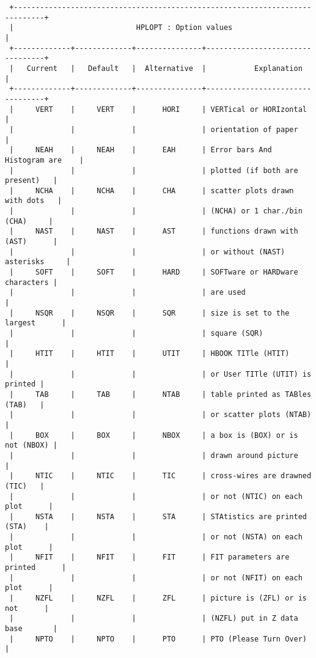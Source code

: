 \begin{verbatim}
 +-----------------------------------------------------------------------------+
 |                            HPLOPT : Option values                           |
 +-------------+-------------+---------------+---------------------------------+
 |   Current   |   Default   |  Alternative  |           Explanation           |
 +-------------+-------------+---------------+---------------------------------+
 |     VERT    |     VERT    |      HORI     | VERTical or HORIzontal          |
 |             |             |               | orientation of paper            |
 |     NEAH    |     NEAH    |      EAH      | Error bars And Histogram are    |
 |             |             |               | plotted (if both are present)   |
 |     NCHA    |     NCHA    |      CHA      | scatter plots drawn with dots   |
 |             |             |               | (NCHA) or 1 char./bin (CHA)     |
 |     NAST    |     NAST    |      AST      | functions drawn with (AST)      |
 |             |             |               | or without (NAST) asterisks     |
 |     SOFT    |     SOFT    |      HARD     | SOFTware or HARDware characters |
 |             |             |               | are used                        |
 |     NSQR    |     NSQR    |      SQR      | size is set to the largest      |
 |             |             |               | square (SQR)                    |
 |     HTIT    |     HTIT    |      UTIT     | HBOOK TITle (HTIT)              |
 |             |             |               | or User TITle (UTIT) is printed |
 |     TAB     |     TAB     |      NTAB     | table printed as TABles (TAB)   |
 |             |             |               | or scatter plots (NTAB)         |
 |     BOX     |     BOX     |      NBOX     | a box is (BOX) or is not (NBOX) |
 |             |             |               | drawn around picture            |
 |     NTIC    |     NTIC    |      TIC      | cross-wires are drawned (TIC)   |
 |             |             |               | or not (NTIC) on each plot      |
 |     NSTA    |     NSTA    |      STA      | STAtistics are printed (STA)    |
 |             |             |               | or not (NSTA) on each plot      |
 |     NFIT    |     NFIT    |      FIT      | FIT parameters are printed      |
 |             |             |               | or not (NFIT) on each plot      |
 |     NZFL    |     NZFL    |      ZFL      | picture is (ZFL) or is not      |
 |             |             |               | (NZFL) put in Z data base       |
 |     NPTO    |     NPTO    |      PTO      | PTO (Please Turn Over)          |

\end{verbatim}
